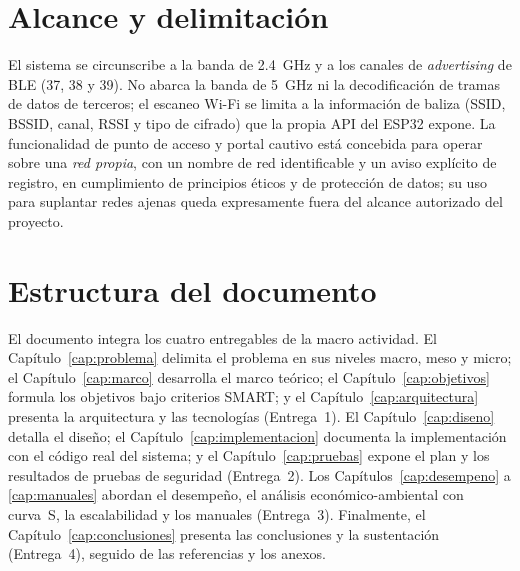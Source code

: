 \section{Alcance y delimitación}
El sistema se circunscribe a la banda de 2.4~GHz y a los canales de \emph{advertising} de BLE (37, 38 y 39). No abarca la banda de 5~GHz ni la decodificación de tramas de datos de terceros; el escaneo Wi\nobreakdash-Fi se limita a la información de baliza (SSID, BSSID, canal, RSSI y tipo de cifrado) que la propia API del ESP32 expone. La funcionalidad de punto de acceso y portal cautivo está concebida para operar sobre una \emph{red propia}, con un nombre de red identificable y un aviso explícito de registro, en cumplimiento de principios éticos y de protección de datos; su uso para suplantar redes ajenas queda expresamente fuera del alcance autorizado del proyecto.

\section{Estructura del documento}
El documento integra los cuatro entregables de la macro actividad. El Capítulo~\ref{cap:problema} delimita el problema en sus niveles macro, meso y micro; el Capítulo~\ref{cap:marco} desarrolla el marco teórico; el Capítulo~\ref{cap:objetivos} formula los objetivos bajo criterios SMART; y el Capítulo~\ref{cap:arquitectura} presenta la arquitectura y las tecnologías (Entrega~1). El Capítulo~\ref{cap:diseno} detalla el diseño; el Capítulo~\ref{cap:implementacion} documenta la implementación con el código real del sistema; y el Capítulo~\ref{cap:pruebas} expone el plan y los resultados de pruebas de seguridad (Entrega~2). Los Capítulos~\ref{cap:desempeno} a \ref{cap:manuales} abordan el desempeño, el análisis económico\nobreakdash-ambiental con curva~S, la escalabilidad y los manuales (Entrega~3). Finalmente, el Capítulo~\ref{cap:conclusiones} presenta las conclusiones y la sustentación (Entrega~4), seguido de las referencias y los anexos.
